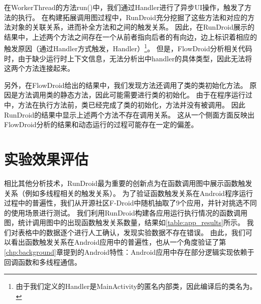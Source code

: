 
在WorkerThread的方法run()中，我们通过Handler进行了异步UI操作，触发了方法的执行。
在构建拓展调用图过程中，RunDroid充分挖掘了这些方法和对应的方法对象的关联关系，进而补全方法和之间的触发关系。
因此，在RunDroid展示的结果中，上述两个方法之间存在一个从前者指向后者的有向边，边上标识着相应的触发原因（通过Handler方式触发，Handler）\footnote{由于我们定义的Handler是MainActivity的匿名内部类，因此编译后的类名为。}。
但是，FlowDroid分析相关代码时，由于缺少运行时上下文信息，无法分析出中handler的具体类型，因此无法将这两个方法连接起来。






另外，在FlowDroid给出的结果中，我们发现方法还调用了类的类初始化方法。
原因是方法调用类的静态方法，因此可能需要进行类的初始化。
由于在程序运行过中，方法在执行方法前，类已经完成了类的初始化，方法并没有被调用。
因此RunDroid的结果中显示上述两个方法不存在调用关系。
这从一个侧面方面反映出FlowDroid分析的结果和动态运行的过程可能存在一定的偏差。





\section{实验效果评估}

相比其他分析技术，RunDroid最为重要的创新点为在函数调用图中展示函数触发关系（例如多线程相关的触发关系）。
为了验证函数触发关系在Android程序运行过程中的普遍性，我们从开源社区F-Droid\cite{FDroidFr21:online}中随机抽取了9个应用，并针对挑选不同的使用场景进行测试。
我们利用RunDroid构建各应用运行执行情况的函数调用图，统计调用图中的出现函数触发关系数量，结果如\autoref{table:app_results}所示。
我们对表格中的数据逐个进行人工确认，发现实验数据不存在错误。
由此，我们可以看出函数触发关系在Android应用中的普遍性，也从一个角度验证了第\ref{chp:background}章提到的Android特性：Android应用中存在部分逻辑实现依赖于回调函数和多线程通信。

